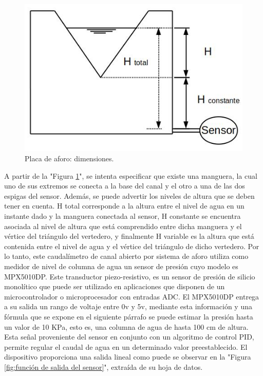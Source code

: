 \begin{figure}
\centering
\includegraphics[scale=.75]{./Figures/AlturaVertedero.png}
\caption{Placa de aforo: dimensiones.}
\label{fig:alturas vertedero}
\end{figure}
A partir de la "Figura \ref{fig:alturas vertedero}", se intenta especificar que existe una manguera, la cual uno de sus extremos se conecta a la base del canal y el otro a una de las dos espigas del sensor. Además, se puede advertir los niveles de altura que se deben tener en cuenta. H total corresponde a la altura entre el nivel de agua en un instante dado y la manguera conectada al sensor, H constante se encuentra asociada al nivel de altura que está comprendido entre dicha manguera y el vértice del triángulo del vertedero, y finalmente H variable es la altura que está contenida entre el nivel de agua y el vértice del triángulo de dicho vertedero.    
Por lo tanto, este caudalímetro de canal abierto por sistema de aforo utiliza como medidor de nivel de columna de agua un sensor de presión cuyo modelo es MPX5010DP. 
Este transductor piezo-resistivo, es un sensor de presión de silicio monolítico que puede ser utilizado en aplicaciones que disponen de un microcontrolador o microprocesador con entradas ADC.
El MPX5010DP entrega a su salida un rango de voltaje entre 0v y 5v, mediante esta información y una fórmula que se expone en el siguiente párrafo se puede estimar la presión hasta un valor de 10 KPa, esto es, una columna de agua de hasta 100 cm de altura.
Esta señal proveniente del sensor en conjunto con un algoritmo de control PID, permite regular el caudal de agua en un determinado valor preestablecido. 
El dispositivo proporciona una salida lineal como puede se observar en la "Figura \ref{fig:función de salida del sensor}", extraída de su hoja de datos.

